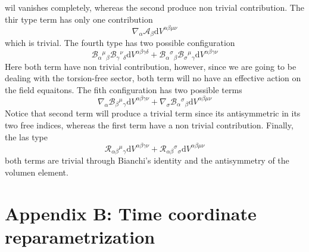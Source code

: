 \documentclass[10pt,a4paper]{article}
\begin{document}
wil vanishes completely, whereas the second produce non trivial contribution. The thir type term has only one contribution
\begin{equation*}
  \nabla_\alpha \mathcal{A}_\beta\mathrm{d}V^{\alpha\beta\mu\nu}
\end{equation*}
which is trivial. The fourth type has two possible configuration
\begin{equation*}
  \mathcal{B}_{\alpha}{}^{\mu}{}_{\beta}\mathcal{B}_{\gamma}{}^{\nu}{}_{\delta}\mathrm{d}V^{\alpha\beta\gamma\delta} + 
  \mathcal{B}_{\alpha}{}^{\sigma}{}_{\beta}\mathcal{B}_{\sigma}{}^{\mu}{}_{\gamma}\mathrm{d}V^{\alpha\beta\gamma\nu} 
\end{equation*}
Here both term have non trivial contribution, however, since we are going to be dealing with the torsion-free sector, both term will no have
an effective action on the field equaitons. The fith configuration has two possible terms
\begin{equation*}
  \nabla_\alpha \mathcal{B}_{\beta}{}^{\mu}{}_{\gamma}\mathrm{d}V^{\alpha\beta\gamma\nu} + 
  \nabla_\sigma \mathcal{B}_{\alpha}{}^{\sigma}{}_{\beta}\mathrm{d}V^{\alpha\beta\mu\nu}
\end{equation*}
Notice that second term will produce a trivial term since its antisymmetric in its two free indices, whereas the first term have a non trivial contribution. Finally,
the las type
\begin{equation*}
  \mathcal{R}_{\alpha\beta}{}^{\mu}{}_{\gamma}\mathrm{d}V^{\alpha\beta\gamma\nu} + 
  \mathcal{R}_{\alpha\beta}{}^{\sigma}{}_{\sigma}\mathrm{d}V^{\alpha\beta\mu\nu}
\end{equation*}
both terms are trivial through Bianchi's identity and the antisymmetry of the volumen element. 

\section{Appendix B: Time coordinate reparametrization}
\end{document}
